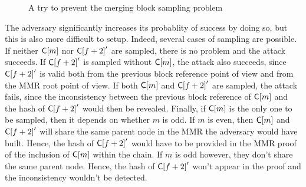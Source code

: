       \begin{figure}[ht]
        \centering
        \caption{A try to prevent the merging block sampling problem}
        \label{figure:chainsewingdouble}
      \end{figure}
        
      The adversary significantly increases its probablity of success by doing so, but this is also more difficult to setup. Indeed, several cases of sampling are possible. If neither \(\mathsf{C[}m\mathsf{]}\) nor \(\mathsf{C[}f+2\mathsf{]}'\) are sampled, there is no problem and the attack succeeds. If \(\mathsf{C[}f+2\mathsf{]}'\) is sampled without \(\mathsf{C[}m\mathsf{]}\), the attack also succeeds, since \(\mathsf{C[}f+2\mathsf{]}'\) is valid both from the previous block reference point of view and from the MMR root point of view. If both \(\mathsf{C[}m\mathsf{]}\) and \(\mathsf{C[}f+2\mathsf{]}'\) are sampled, the attack fails, since the inconsistency between the previous block reference of \(\mathsf{C[}m\mathsf{]}\) and the hash of \(\mathsf{C[}f+2\mathsf{]}'\) would then be revealed. Finally, if \(\mathsf{C[}m\mathsf{]}\) is the only one to be sampled, then it depends on whether \(m\) is odd. If \(m\) is even, then \(\mathsf{C[}m\mathsf{]}\) and \(\mathsf{C[}f+2\mathsf{]}'\) will share the same parent node in the MMR the adversary would have built. Hence, the hash of \(\mathsf{C[}f+2\mathsf{]}'\) would have to be provided in the MMR proof of the inclusion of \(\mathsf{C[}m\mathsf{]}\) within the chain. If \(m\) is odd however, they don't share the same parent node. Hence, the hash of \(\mathsf{C[}f+2\mathsf{]}'\) won't appear in the proof and the inconsistency wouldn't be detected.  

